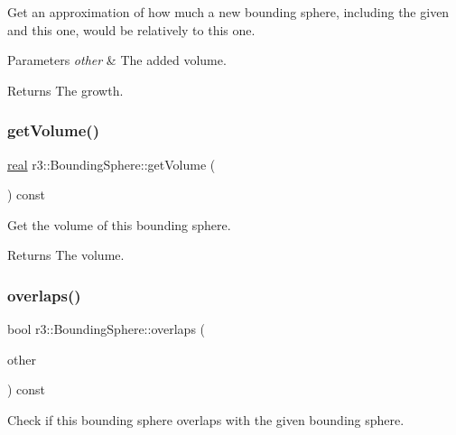 Get an approximation of how much a new bounding sphere, including the given and this one, would be relatively to this one. 


\begin{DoxyParams}{Parameters}
{\em other} & The added volume. \\
\hline
\end{DoxyParams}
\begin{DoxyReturn}{Returns}
The growth. 
\end{DoxyReturn}
\mbox{\label{classr3_1_1_bounding_sphere_a01cc1a7397eeec86d2b074d2bf734798}} 
\subsubsection{\texorpdfstring{get\+Volume()}{getVolume()}}
{\footnotesize\ttfamily \mbox{\hyperlink{namespacer3_ab2016b3e3f743fb735afce242f0dc1eb}{real}} r3\+::\+Bounding\+Sphere\+::get\+Volume (\begin{DoxyParamCaption}{ }\end{DoxyParamCaption}) const}

Get the volume of this bounding sphere. \begin{DoxyReturn}{Returns}
The volume. 
\end{DoxyReturn}
\mbox{\label{classr3_1_1_bounding_sphere_a49163c78b0d1318c576d99e61f806ac2}} 
\subsubsection{\texorpdfstring{overlaps()}{overlaps()}}
{\footnotesize\ttfamily bool r3\+::\+Bounding\+Sphere\+::overlaps (\begin{DoxyParamCaption}\item[{const \mbox{\hyperlink{classr3_1_1_bounding_sphere}{Bounding\+Sphere}} $\ast$}]{other }\end{DoxyParamCaption}) const}



Check if this bounding sphere overlaps with the given bounding sphere. 

